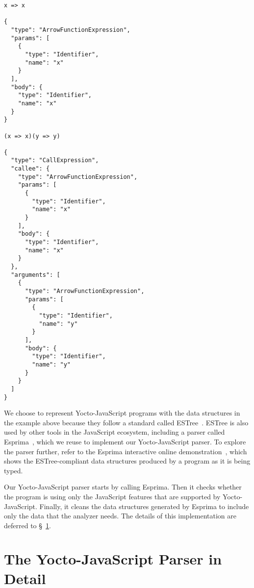 \documentclass[12pt, oneside]{book}
\begin{document}
\begin{verbatim}
x => x

{
  "type": "ArrowFunctionExpression",
  "params": [
    {
      "type": "Identifier",
      "name": "x"
    }
  ],
  "body": {
    "type": "Identifier",
    "name": "x"
  }
}

(x => x)(y => y)

{
  "type": "CallExpression",
  "callee": {
    "type": "ArrowFunctionExpression",
    "params": [
      {
        "type": "Identifier",
        "name": "x"
      }
    ],
    "body": {
      "type": "Identifier",
      "name": "x"
    }
  },
  "arguments": [
    {
      "type": "ArrowFunctionExpression",
      "params": [
        {
          "type": "Identifier",
          "name": "y"
        }
      ],
      "body": {
        "type": "Identifier",
        "name": "y"
      }
    }
  ]
}
\end{verbatim}

We choose to represent Yocto-JavaScript programs with the data structures in the example above because they follow a standard called ESTree~\cite{estree}. ESTree is also used by other tools in the JavaScript ecosystem, including a parser called Esprima~\cite{esprima}, which we reuse to implement our Yocto-JavaScript parser. To explore the parser further, refer to the Esprima interactive online demonstration~\cite{esprima-demonstration}, which shows the ESTree-compliant data structures produced by a program as it is being typed.

Our Yocto-JavaScript parser starts by calling Esprima. Then it checks whether the program is using only the JavaScript features that are supported by Yocto-JavaScript. Finally, it cleans the data structures generated by Esprima to include only the data that the analyzer needs. The details of this implementation are deferred to §~\ref{the-yocto-javascript-parser-in-detail}.


\appendix

\chapter{The Yocto-JavaScript Parser in Detail}
\label{the-yocto-javascript-parser-in-detail}

\end{document}
